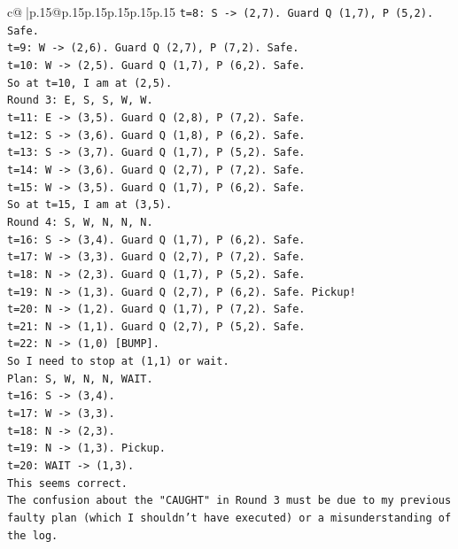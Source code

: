 \documentclass{article}
\begin{document}
{\begin{supertabular}{c@{$\;$}|p{.15\linewidth}@{}p{.15\linewidth}p{.15\linewidth}p{.15\linewidth}p{.15\linewidth}p{.15\linewidth}}
{{{\texttt{t=8: S {-}> (2,7). Guard Q (1,7), P (5,2). Safe.} \\
\texttt{t=9: W {-}> (2,6). Guard Q (2,7), P (7,2). Safe.} \\
\texttt{t=10: W {-}> (2,5). Guard Q (1,7), P (6,2). Safe.} \\
\texttt{So at t=10, I am at (2,5).} \\
\texttt{Round 3: E, S, S, W, W.} \\
\texttt{t=11: E {-}> (3,5). Guard Q (2,8), P (7,2). Safe.} \\
\texttt{t=12: S {-}> (3,6). Guard Q (1,8), P (6,2). Safe.} \\
\texttt{t=13: S {-}> (3,7). Guard Q (1,7), P (5,2). Safe.} \\
\texttt{t=14: W {-}> (3,6). Guard Q (2,7), P (7,2). Safe.} \\
\texttt{t=15: W {-}> (3,5). Guard Q (1,7), P (6,2). Safe.} \\
\texttt{So at t=15, I am at (3,5).} \\
\texttt{Round 4: S, W, N, N, N.} \\
\texttt{t=16: S {-}> (3,4). Guard Q (1,7), P (6,2). Safe.} \\
\texttt{t=17: W {-}> (3,3). Guard Q (2,7), P (7,2). Safe.} \\
\texttt{t=18: N {-}> (2,3). Guard Q (1,7), P (5,2). Safe.} \\
\texttt{t=19: N {-}> (1,3). Guard Q (2,7), P (6,2). Safe. Pickup!} \\
\texttt{t=20: N {-}> (1,2). Guard Q (1,7), P (7,2). Safe.} \\
\texttt{t=21: N {-}> (1,1). Guard Q (2,7), P (5,2). Safe.} \\
\texttt{t=22: N {-}> (1,0) {[}BUMP{]}.} \\
\texttt{So I need to stop at (1,1) or wait.} \\
\texttt{Plan: S, W, N, N, WAIT.} \\
\texttt{t=16: S {-}> (3,4).} \\
\texttt{t=17: W {-}> (3,3).} \\
\texttt{t=18: N {-}> (2,3).} \\
\texttt{t=19: N {-}> (1,3). Pickup.} \\
\texttt{t=20: WAIT {-}> (1,3).} \\
\texttt{This seems correct.} \\
\texttt{The confusion about the "CAUGHT" in Round 3 must be due to my previous faulty plan (which I shouldn't have executed) or a misunderstanding of the log.} \\
}}}
\end{supertabular}}
\end{document}
